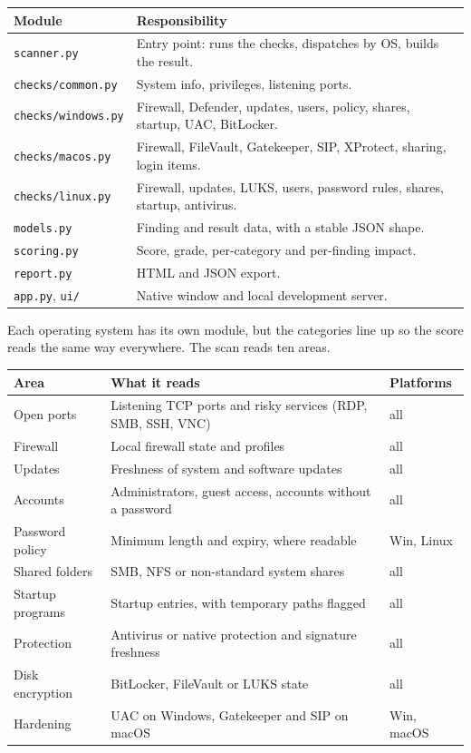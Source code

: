 \documentclass[11pt,a4paper]{article}
\begin{document}
\begin{table}[h]
\centering\small
\begin{tabular}{@{}ll@{}}
\toprule
Module & Responsibility \\
\midrule
\texttt{scanner.py} & Entry point: runs the checks, dispatches by OS, builds the result. \\
\texttt{checks/common.py} & System info, privileges, listening ports. \\
\texttt{checks/windows.py} & Firewall, Defender, updates, users, policy, shares, startup, UAC, BitLocker. \\
\texttt{checks/macos.py} & Firewall, FileVault, Gatekeeper, SIP, XProtect, sharing, login items. \\
\texttt{checks/linux.py} & Firewall, updates, LUKS, users, password rules, shares, startup, antivirus. \\
\texttt{models.py} & Finding and result data, with a stable JSON shape. \\
\texttt{scoring.py} & Score, grade, per-category and per-finding impact. \\
\texttt{report.py} & HTML and JSON export. \\
\texttt{app.py}, \texttt{ui/} & Native window and local development server. \\
\bottomrule
\end{tabular}
\end{table}

Each operating system has its own module, but the categories line up so the score
reads the same way everywhere. The scan reads ten areas.

\begin{table}[h]
\centering\small
\begin{tabular}{@{}lll@{}}
\toprule
Area & What it reads & Platforms \\
\midrule
Open ports & Listening TCP ports and risky services (RDP, SMB, SSH, VNC) & all \\
Firewall & Local firewall state and profiles & all \\
Updates & Freshness of system and software updates & all \\
Accounts & Administrators, guest access, accounts without a password & all \\
Password policy & Minimum length and expiry, where readable & Win, Linux \\
Shared folders & SMB, NFS or non-standard system shares & all \\
Startup programs & Startup entries, with temporary paths flagged & all \\
Protection & Antivirus or native protection and signature freshness & all \\
Disk encryption & BitLocker, FileVault or LUKS state & all \\
Hardening & UAC on Windows, Gatekeeper and SIP on macOS & Win, macOS \\
\bottomrule
\end{tabular}
\end{table}
\end{document}
